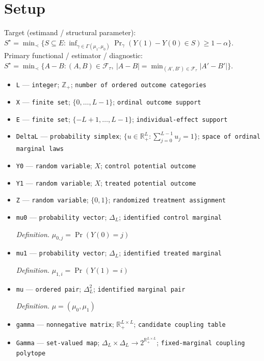 \documentclass{article}
\begin{document}
\section{Setup}

Target (estimand / structural parameter): \(S^\star=\min_{\prec}\{S\subseteq E:\inf_{\gamma\in\Gamma(\mu_1,\mu_0)}\Pr_{\gamma}(Y(1)-Y(0)\in S)\geq1-\alpha\}\).
Primary functional / estimator / diagnostic: \(S^\star=\min_{\prec}\{A-B:(A,B)\in\mathcal F_{\tau},\ |A-B|=\min_{(A',B')\in\mathcal F_{\tau}}|A'-B'|\}\).
\begin{itemize}
  \item \texttt{L} --- \texttt{integer}; \(\mathbb Z_{+}\); \texttt{number of ordered outcome categories}
  \item \texttt{X} --- \texttt{finite set}; \(\{0,\ldots,L-1\}\); \texttt{ordinal outcome support}
  \item \texttt{E} --- \texttt{finite set}; \(\{-L+1,\ldots,L-1\}\); \texttt{individual-\allowbreak{}effect support}
  \item \texttt{DeltaL} --- \texttt{probability simplex}; \(\{u\in\mathbb R_{+}^{L}:\sum_{j=0}^{L-1}u_j=1\}\); \texttt{space of ordinal marginal laws}
  \item \texttt{Y0} --- \texttt{random variable}; \(X\); \texttt{control potential outcome}
  \item \texttt{Y1} --- \texttt{random variable}; \(X\); \texttt{treated potential outcome}
  \item \texttt{Z} --- \texttt{random variable}; \(\{0,1\}\); \texttt{randomized treatment assignment}
  \item \texttt{mu0} --- \texttt{probability vector}; \(\Delta_L\); \texttt{identified control marginal}
  \par\smallskip\noindent\emph{Definition.} \(\mu_{0,j}=\Pr(Y(0)=j)\)
  \item \texttt{mu1} --- \texttt{probability vector}; \(\Delta_L\); \texttt{identified treated marginal}
  \par\smallskip\noindent\emph{Definition.} \(\mu_{1,i}=\Pr(Y(1)=i)\)
  \item \texttt{mu} --- \texttt{ordered pair}; \(\Delta_L^2\); \texttt{identified marginal pair}
  \par\smallskip\noindent\emph{Definition.} \(\mu=(\mu_0,\mu_1)\)
  \item \texttt{gamma} --- \texttt{nonnegative matrix}; \(\mathbb R_{+}^{L\times L}\); \texttt{candidate coupling table}
  \item \texttt{Gamma} --- \texttt{set-\allowbreak{}valued map}; \(\Delta_L\times\Delta_L\to2^{\mathbb R_{+}^{L\times L}}\); \texttt{fixed-\allowbreak{}marginal coupling polytope}

\end{itemize}
\end{document}
